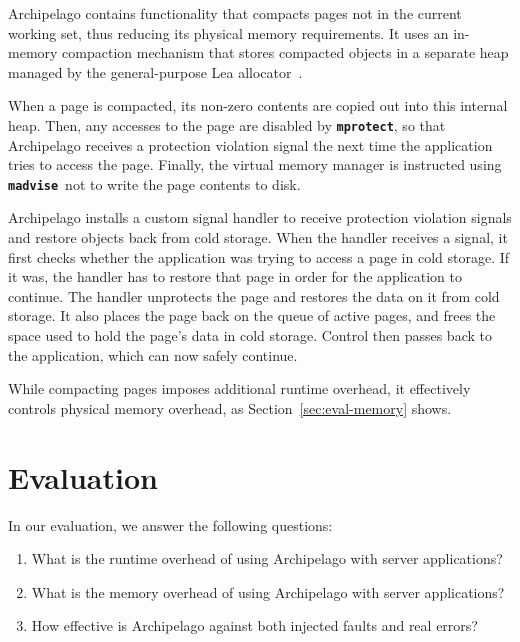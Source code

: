 \documentclass{acm_proc_article-sp}
\newcommand{\cfunction}[1]{{\bf \tt #1}}
\newcommand{\madvise}{\cfunction{madvise}}
\newcommand{\mprotect}{\cfunction{mprotect}}
\begin{document}
\noindent
Archipelago contains functionality that compacts pages not in the
current working set, thus reducing its physical memory
requirements. It uses an in-memory compaction mechanism that stores
compacted objects in a separate heap managed by the general-purpose
Lea allocator~\cite{lea97}.

When a page is compacted, its non-zero contents are copied out into
this internal heap. Then, any accesses to the page are disabled by
\mprotect, so that Archipelago receives a protection violation signal
the next time the application tries to access the page. Finally, the
virtual memory manager is instructed using
\madvise\ not to write the page contents to disk.

Archipelago installs a custom signal handler to receive protection
violation signals and restore objects back from cold storage. When the
handler receives a signal, it first checks whether the application was
trying to access a page in cold storage. If it was, the handler has to
restore that page in order for the application to continue. The
handler unprotects the page and restores the data on it from cold
storage. It also places the page back on the queue of active pages,
and frees the space used to hold the page's data in cold
storage. Control then passes back to the application, which can now
safely continue.


While compacting pages imposes additional runtime overhead, it
effectively controls physical memory overhead, as
Section~\ref{sec:eval-memory} shows.


\section{Evaluation}
\label{sec:eval}

\noindent
In our evaluation, we answer the following questions:

\begin{enumerate}
\item What is the runtime overhead of using Archipelago with server applications?
\item What is the memory overhead of using Archipelago with server applications?
\item How effective is Archipelago against both injected faults and real errors?

\end{enumerate}
\end{document}
